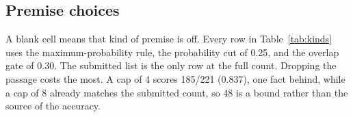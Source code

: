\subsection{Premise choices}

A blank cell means that kind of premise is off. Every row in Table~\ref{tab:kinds} uses the maximum-probability rule, the probability cut of 0.25, and the overlap gate of 0.30. The submitted list is the only row at the full count. Dropping the passage costs the most. A cap of 4 scores 185/221 (0.837), one fact behind, while a cap of 8 already matches the submitted count, so 48 is a bound rather than the source of the accuracy.

\begin{table}[H]
\centering
\caption{Premise kinds}
\label{tab:kinds}
{\footnotesize
{}
}
\end{table}

